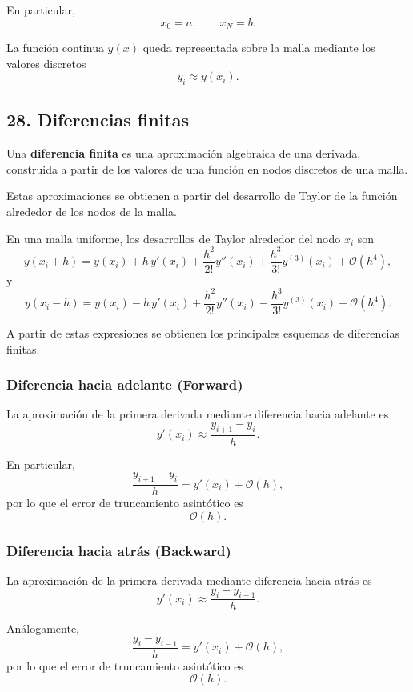 \documentclass[12pt]{article}
\begin{document}
En particular,
\[
x_0=a,
\qquad
x_N=b.
\]

La función continua $y(x)$ queda representada sobre la malla mediante los
valores discretos
\[
\boxed{
y_i\approx y(x_i).
}
\]

\subsection*{28. Diferencias finitas}

\begin{definition}
Una \textbf{diferencia finita} es una aproximación algebraica de una
derivada, construida a partir de los valores de una función en nodos
discretos de una malla.

Estas aproximaciones se obtienen a partir del desarrollo de Taylor de la
función alrededor de los nodos de la malla.
\end{definition}

En una malla uniforme, los desarrollos de Taylor alrededor del nodo $x_i$
son
\[
y(x_i+h)
=
y(x_i)
+h\,y'(x_i)
+\frac{h^2}{2!}y''(x_i)
+\frac{h^3}{3!}y^{(3)}(x_i)
+\mathcal{O}(h^4),
\]
y
\[
y(x_i-h)
=
y(x_i)
-h\,y'(x_i)
+\frac{h^2}{2!}y''(x_i)
-\frac{h^3}{3!}y^{(3)}(x_i)
+\mathcal{O}(h^4).
\]

A partir de estas expresiones se obtienen los principales esquemas de
diferencias finitas.

\subsubsection*{Diferencia hacia adelante (Forward)}

La aproximación de la primera derivada mediante diferencia hacia adelante es
\[
\boxed{
y'(x_i)\approx
\frac{y_{i+1}-y_i}{h}.
}
\]

En particular,
\[
\frac{y_{i+1}-y_i}{h}
=
y'(x_i)+\mathcal{O}(h),
\]
por lo que el error de truncamiento asintótico es
\[
\boxed{
\mathcal{O}(h).
}
\]

\subsubsection*{Diferencia hacia atrás (Backward)}

La aproximación de la primera derivada mediante diferencia hacia atrás es
\[
\boxed{
y'(x_i)\approx
\frac{y_i-y_{i-1}}{h}.
}
\]

Análogamente,
\[
\frac{y_i-y_{i-1}}{h}
=
y'(x_i)+\mathcal{O}(h),
\]
por lo que el error de truncamiento asintótico es
\[
\boxed{
\mathcal{O}(h).
}
\]
\end{document}
